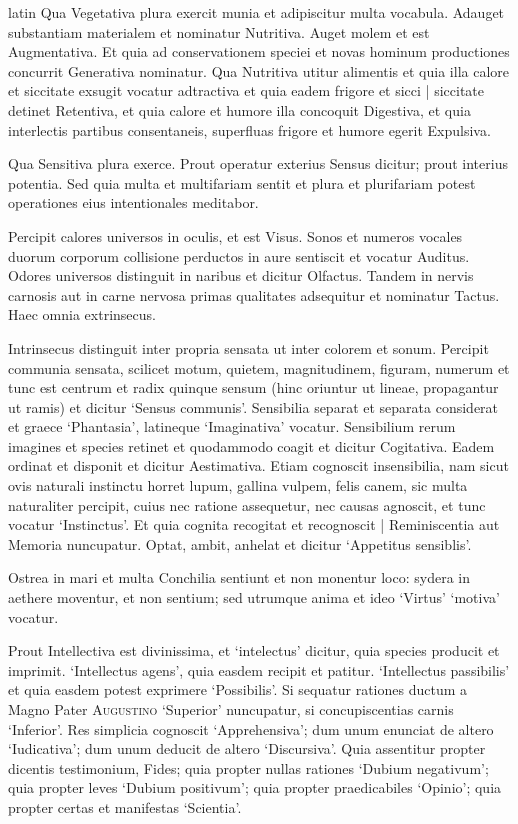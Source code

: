 \begin{otherlanguage*}{latin}
\pstart
Qua Vegetativa plura exercit munia et adipiscitur multa vocabula. Adauget substantiam materialem et nominatur Nutritiva. Auget molem et est Augmentativa. Et quia ad conservationem speciei et novas hominum productiones concurrit Generativa nominatur. Qua Nutritiva utitur alimentis et quia illa calore et siccitate exsugit vocatur adtractiva et quia eadem frigore et sicci \textnormal{|} siccitate detinet Retentiva, et quia calore et humore illa concoquit Digestiva, et quia interlectis partibus consentaneis, superfluas frigore et humore egerit Expulsiva. 
\pend

\pstart
Qua Sensitiva plura exerce. Prout operatur exterius Sensus dicitur; prout interius potentia. Sed quia multa et multifariam sentit et plura et plurifariam potest operationes eius intentionales meditabor. 
\pend

\pstart
Percipit calores universos in oculis, et est Visus. Sonos et numeros vocales duorum corporum collisione perductos in aure sentiscit et vocatur Auditus. Odores universos distinguit in naribus et dicitur Olfactus. Tandem in nervis carnosis aut in carne nervosa primas qualitates adsequitur et nominatur Tactus. Haec omnia extrinsecus. 
\pend

\pstart
Intrinsecus distinguit inter propria sensata ut inter colorem et sonum. Percipit communia sensata, scilicet motum, quietem, magnitudinem, figuram, numerum et tunc est centrum et radix quinque sensum (hinc oriuntur ut lineae, propagantur ut ramis) et dicitur `Sensus communis'. Sensibilia separat et separata considerat et graece `Phantasia', latineque `Imaginativa' vocatur. Sensibilium rerum imagines et species retinet et quodammodo coagit et dicitur Cogitativa. Eadem ordinat et disponit et dicitur Aestimativa. Etiam cognoscit insensibilia, nam sicut ovis naturali instinctu horret lupum, gallina vulpem, felis canem, sic multa naturaliter percipit, cuius nec ratione assequetur, nec causas agnoscit, et tunc vocatur `Instinctus'. Et quia cognita recogitat et recognoscit \textnormal{|} Reminiscentia aut Memoria nuncupatur. Optat, ambit, anhelat et dicitur `Appetitus sensiblis'. 
\pend

\pstart
Ostrea in mari et multa Conchilia sentiunt et non monentur loco:
sydera in aethere moventur, et non sentium; sed utrumque anima et ideo `Virtus' `motiva' vocatur. 
\pend

\pstart
Prout Intellectiva est divinissima, et `intelectus' dicitur, quia species producit et imprimit. `Intellectus agens', quia easdem recipit et patitur. `Intellectus passibilis' et quia easdem potest exprimere `Possibilis'. Si sequatur rationes ductum a Magno Pater \textsc{Augustino} `Superior' nuncupatur, si concupiscentias carnis `Inferior'. Res simplicia cognoscit `Apprehensiva'; dum unum enunciat de altero `Iudicativa'; dum unum deducit de altero `Discursiva'. Quia assentitur propter dicentis testimonium, Fides; quia propter nullas rationes `Dubium negativum'; quia propter leves `Dubium positivum'; quia propter praedicabiles `Opinio'; quia propter certas et manifestas `Scientia'. 
\pend


\end{otherlanguage*}
